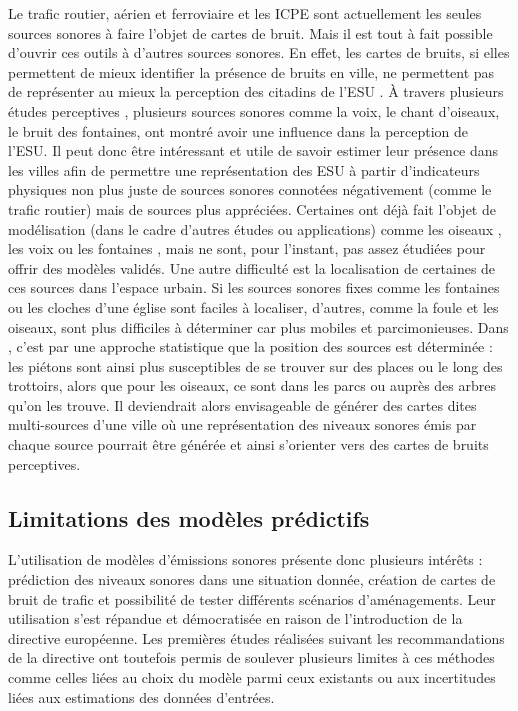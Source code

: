 Le trafic routier, aérien et ferroviaire et les ICPE sont actuellement les seules sources sonores à faire l'objet de cartes de bruit. Mais il est tout à fait possible d'ouvrir ces outils à d'autres sources sonores.
En effet, les cartes de bruits, si elles permettent de mieux identifier la présence de bruits en ville, ne permettent pas de représenter au mieux la perception des citadins de l'ESU \cite{brown2012review}. À travers plusieurs études perceptives \cite{lavandier2006contribution,hong2013designing}, plusieurs sources sonores comme la voix, le chant d'oiseaux, le bruit des fontaines, ont montré avoir une influence dans la perception de l'ESU.
Il peut donc être intéressant et utile de savoir estimer leur présence dans les villes afin de permettre une représentation des ESU à partir d'indicateurs physiques non plus juste de sources sonores connotées négativement (comme le trafic routier) mais de sources plus appréciées.
Certaines ont déjà fait l'objet de modélisation (dans le cadre d'autres études ou applications) comme les oiseaux \cite{nemeth2013bird}, les voix \cite{hayne2011prediction} ou les fontaines \cite{watts2009measurement}, mais ne sont, pour l'instant, pas assez étudiées pour offrir des modèles validés.
Une autre difficulté est la localisation de certaines de ces sources dans l'espace urbain. Si les sources sonores fixes comme les fontaines ou les cloches d'une église sont faciles à localiser, d'autres, comme la foule et les oiseaux, sont plus difficiles à déterminer car plus mobiles et parcimonieuses. Dans \cite{aumond2018probabilistic}, c'est par une approche statistique que la position des sources est déterminée : les piétons sont ainsi plus susceptibles de se trouver sur des places ou le long des trottoirs, alors que pour les oiseaux, ce sont dans les parcs ou auprès des arbres qu'on les trouve. Il deviendrait alors envisageable de générer des cartes dites multi-sources d'une ville où une représentation des niveaux sonores émis par chaque source pourrait être générée et ainsi s'orienter vers des cartes de bruits perceptives.


\subsection{Limitations des modèles prédictifs}

L'utilisation de modèles d'émissions sonores présente donc plusieurs intérêts : prédiction des niveaux sonores dans une situation donnée, création de cartes de bruit de trafic et possibilité de tester différents scénarios d'aménagements. Leur utilisation s'est répandue et démocratisée en raison de l'introduction de la directive européenne. Les premières études réalisées suivant les recommandations de la directive ont toutefois permis de soulever plusieurs limites à ces méthodes comme celles liées au choix du modèle parmi ceux existants ou aux incertitudes liées aux estimations des données d'entrées.

